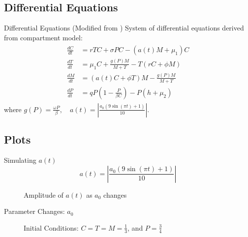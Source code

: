 \documentclass{beamer}
\begin{document}
\subsection{Differential Equations}
\begin{frame}{Differential Equations {\small(Modified from \cite{13_blackwood_hastings_mumby_2010})}}
    System of differential equations derived from compartment model:
    \begin{align*}
        \begin{split}
            \frac{dC}{dt} &= rTC + \sigma PC- (a(t)M+\mu_{1})C\\
            \frac{dT}{dt} &= \mu_{1}C + \frac{g(P)M}{M+T} - T(rC+\phi M)\\
            \frac{dM}{dt} &= (a(t)C+ \phi T)M - \frac{g(P)M}{M+T}\\
            \frac{dP}{dt} &= qP \left( 1-\frac{P}{\beta C} \right) - P \left( h+\mu_{2} \right)
            \label{SoODE}
        \end{split}
    \end{align*}
    where $\displaystyle g(P) = \frac{\omega P}{\beta}, \quad a(t)=\left|\frac{a_{0}(9\sin{(\pi t) }+1)}{10}\right|$.\\ 
    \quad
\end{frame}

\subsection{Plots}
\begin{frame}{Simulating $a(t)$}
    \vspace{-0.3cm}
    $$a(t)= \left|\frac{a_{0}(9\sin{(\pi t) }+1)}{10} \right|$$
    \vspace{-0.5cm}
    \begin{figure}
        \centering
        \caption{Amplitude of $a(t)$ as $a_{0}$ changes}
        \label{fig:matlab_a_animation}
    \end{figure}
\end{frame}

\begin{frame}{Parameter Changes: $a_{0}$}
    \begin{figure}
        \centering
        \caption{Initial Conditions: $C = T = M = \frac{1}{3}$, and $P = \frac{3}{4}$}
        \label{fig:a_animation}
    \end{figure}
\end{frame}
\end{document}

